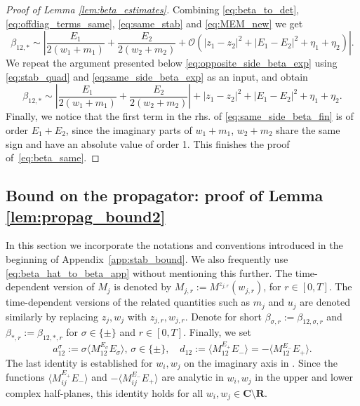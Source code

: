 \documentclass[10pt]{amsart}
\numberwithin{equation}{section}
\newcommand{\R}{\mathbf{R}}
\newcommand{\C}{\mathbf{C}}
\begin{document}
\begin{proof}[Proof of Lemma \ref{lem:beta_estimates}]
Combining \eqref{eq:beta_to_det}, \eqref{eq:offdiag_terms_same}, \eqref{eq:same_stab} and \eqref{eq:MEM_new} we get
\begin{equation}
\beta_{12,*}\sim \left\vert \frac{E_1}{2(w_1+m_1)}+\frac{E_2}{2(w_2+m_2)} + \mathcal{O}(|z_1-z_2|^2 +|E_1-E_2|^2+\eta_1+\eta_2)\right\vert.
\label{eq:same_side_beta_exp}
\end{equation}
We repeat the argument presented below \eqref{eq:opposite_side_beta_exp} using \eqref{eq:stab_quad} and \eqref{eq:same_side_beta_exp} as an input, and obtain
\begin{equation}
\beta_{12,*}\sim \left\vert \frac{E_1}{2(w_1+m_1)}+\frac{E_2}{2(w_2+m_2)}\right\vert + |z_1-z_2|^2 +|E_1-E_2|^2+\eta_1+\eta_2.
\label{eq:same_side_beta_fin}
\end{equation}
Finally, we notice that the first term in the rhs. of \eqref{eq:same_side_beta_fin} is of order $E_1+E_2$, since the imaginary parts of $w_1+m_1$, $w_2+m_2$ share the same sign and have an absolute value of order 1. This finishes the proof of~\eqref{eq:beta_same}.
\end{proof}



\subsection{Bound on the propagator: proof of Lemma \ref{lem:propag_bound2}}\label{app:propagator}

In this section we incorporate the notations and conventions introduced in the beginning of Appendix~\ref{app:stab_bound}. We also frequently use \eqref{eq:beta_hat_to_beta_app} without mentioning this further. The time-dependent version of $M_j$ is denoted by $M_{j,r}:=M^{z_{j,r}}(w_{j,r})$, for $r\in [0,T]$. The time-dependent versions of the related quantities such as $m_j$ and $u_j$ are denoted similarly by replacing $z_j,w_j$ with $z_{j,r}, w_{j,r}$. Denote for short $\beta_{\sigma,r}:=\beta_{12,\sigma,r}$ and $\beta_{*,r}:=\beta_{12,*,r}$ for $\sigma\in\{\pm\}$ and $r\in [0,T]$. Finally, we set
\begin{equation}
a_{12}^\sigma :=\sigma \langle M_{12}^{E_\sigma}E_\sigma\rangle,\,\sigma\in\{\pm\},\quad d_{12}:=\langle M_{12}^{E_+}E_-\rangle = -\langle M_{12}^{E_-}E_+\rangle.
\end{equation}
The last identity is established for $w_i, w_j$ on the imaginary axis in \cite[Eq.(5.26)]{univ_extr}. Since the functions $\langle M_{ij}^{E_+}E_-\rangle$ and $-\langle M_{ij}^{E_-}E_+\rangle$ are analytic in $w_i,w_j$ in the upper and lower complex half-planes, this identity holds for all $w_i,w_j\in\C\setminus\R$.
\end{document}
